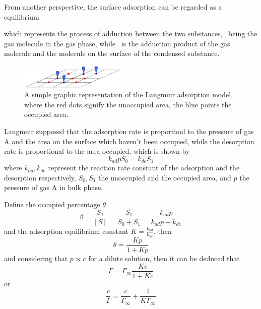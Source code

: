 \documentclass[%
 reprint,
 amsmath,amssymb,
 aps,
10.5pt,
]{revtex4-1}
\begin{document}
From another perspective, the surface adsorption can be regarded as a equilibrium
\begin{center}
\end{center}
which represents the process of adduction between the two substances, ~being the gas molecule in the gas phase, while ~is the adduction product of the gas molecule and the molecule on the surface of the condensed substance.

\begin{figure}
\centering
\includegraphics[width=0.45\textwidth]{figures/Langmuir_Adsorption_Model.jpg}
\caption{A simple graphic representation of the Langmuir adsorption model, where the red dots signify the unoccupied area, the blue points the occupied area.}
\end{figure}

Langmuir\cite{langmuir1918adsorption} supposed that the adsorption rate is proportionl to the pressure of gas A and the area on the surface which haven't been occupied, while the desorption rate is proportional to the area occupied, which is shown by
\begin{equation}
k_{ad} p S_0 = k_{de} S_1
\end{equation}
where $k_{ad},k_{de}$ represent the reaction rate constant of the adsorption and the desorption respectively, $S_0,S_1$ the unoccupied and the occupied area, and $p$ the pressure of gas A in bulk phase.

Define the occupied percentage $\theta$
\begin{equation}
\theta = \frac{S_1}{[S]} = \frac{S_1}{S_0+S_1} = \frac{k_{ad}p}{k_{ad}p+k_{de}}
\end{equation}
and the adsorption equilibrium constant $K=\frac{k_{ad}}{k_{de}}$, then
\begin{equation}
\theta = \frac{Kp}{1+Kp}
\end{equation}
and considering that $p \propto c$ for a dilute solution, then it can be deduced that
\begin{equation}
\Gamma = \Gamma_\infty \frac{Kc}{1+Kc}
\end{equation}
or
\begin{equation}
\frac{c}{\Gamma} = \frac{c}{\Gamma_\infty} + \frac{1}{K \Gamma_\infty}
\end{equation}
\end{document}
